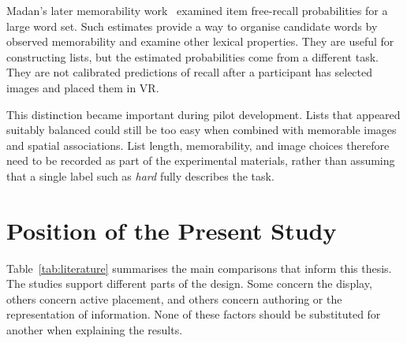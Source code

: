 Madan's later memorability work~\cite{madan2021} examined item free-recall probabilities for a large word set. Such estimates provide a way to organise candidate words by observed memorability and examine other lexical properties. They are useful for constructing lists, but the estimated probabilities come from a different task. They are not calibrated predictions of recall after a participant has selected images and placed them in VR.

This distinction became important during pilot development. Lists that appeared suitably balanced could still be too easy when combined with memorable images and spatial associations. List length, memorability, and image choices therefore need to be recorded as part of the experimental materials, rather than assuming that a single label such as \emph{hard} fully describes the task.

\section{Position of the Present Study}
Table~\ref{tab:literature} summarises the main comparisons that inform this thesis. The studies support different parts of the design. Some concern the display, others concern active placement, and others concern authoring or the representation of information. None of these factors should be substituted for another when explaining the results.

